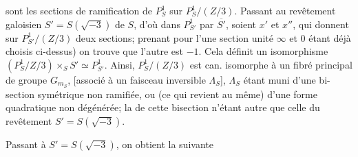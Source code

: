 sont les sections de ramification de $P^1_S$ sur $P^1_S/(Z/3)$. Passant au revêtement galoisien $S'=S(\sqrt{-3})$ de $S$, d'où dans $P^1_{S'}$   par $\overline{S'}$, soient $x'$ et $x''$, qui donnent sur $P^1_{S'}/(Z/3)$ deux sections; prenant pour l'une   section unité  $\infty$ et $0$ étant déjà choisis ci-dessus) on trouve que l'autre est $-1$. Cela définit un isomorphisme $(P^1_S/Z/3)\times_S S'\simeq P^1_{S'}$. Ainsi, $P^1_S/(Z/3)$ est can. isomorphe à un fibré principal de groupe $G_{m_S}$, [associé à un faisceau inversible $\Lambda_S$], $\Lambda_S$ étant muni d'une bi-section  symétrique non ramifiée, ou (ce qui revient au même) d'une forme quadratique non dégénérée; la   de cette bisection n'étant autre que celle du revêtement $S'=S(\sqrt{-3})$.

Passant à $S'=S(\sqrt{-3})$, on obtient la  suivante

